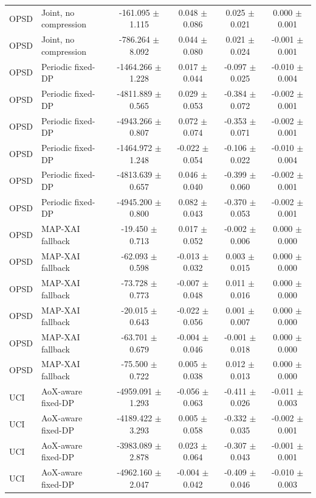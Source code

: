 \begin{tabular}{llcccc}
OPSD & Joint, no compression & -161.095 $\pm$ 1.115 & 0.048 $\pm$ 0.086 & 0.025 $\pm$ 0.021 & 0.000 $\pm$ 0.001 \\
OPSD & Joint, no compression & -786.264 $\pm$ 8.092 & 0.044 $\pm$ 0.080 & 0.021 $\pm$ 0.024 & -0.001 $\pm$ 0.001 \\
OPSD & Periodic fixed-DP & -1464.266 $\pm$ 1.228 & 0.017 $\pm$ 0.044 & -0.097 $\pm$ 0.025 & -0.010 $\pm$ 0.004 \\
OPSD & Periodic fixed-DP & -4811.889 $\pm$ 0.565 & 0.029 $\pm$ 0.053 & -0.384 $\pm$ 0.072 & -0.002 $\pm$ 0.001 \\
OPSD & Periodic fixed-DP & -4943.266 $\pm$ 0.807 & 0.072 $\pm$ 0.074 & -0.353 $\pm$ 0.071 & -0.002 $\pm$ 0.001 \\
OPSD & Periodic fixed-DP & -1464.972 $\pm$ 1.248 & -0.022 $\pm$ 0.054 & -0.106 $\pm$ 0.022 & -0.010 $\pm$ 0.004 \\
OPSD & Periodic fixed-DP & -4813.639 $\pm$ 0.657 & 0.046 $\pm$ 0.040 & -0.399 $\pm$ 0.060 & -0.002 $\pm$ 0.001 \\
OPSD & Periodic fixed-DP & -4945.200 $\pm$ 0.800 & 0.082 $\pm$ 0.043 & -0.370 $\pm$ 0.053 & -0.002 $\pm$ 0.001 \\
OPSD & MAP-XAI fallback & -19.450 $\pm$ 0.713 & 0.017 $\pm$ 0.052 & -0.002 $\pm$ 0.006 & 0.000 $\pm$ 0.000 \\
OPSD & MAP-XAI fallback & -62.093 $\pm$ 0.598 & -0.013 $\pm$ 0.032 & 0.003 $\pm$ 0.015 & 0.000 $\pm$ 0.000 \\
OPSD & MAP-XAI fallback & -73.728 $\pm$ 0.773 & -0.007 $\pm$ 0.048 & 0.011 $\pm$ 0.016 & 0.000 $\pm$ 0.000 \\
OPSD & MAP-XAI fallback & -20.015 $\pm$ 0.643 & -0.022 $\pm$ 0.056 & 0.001 $\pm$ 0.007 & 0.000 $\pm$ 0.000 \\
OPSD & MAP-XAI fallback & -63.701 $\pm$ 0.679 & -0.004 $\pm$ 0.046 & -0.001 $\pm$ 0.018 & 0.000 $\pm$ 0.000 \\
OPSD & MAP-XAI fallback & -75.500 $\pm$ 0.722 & 0.005 $\pm$ 0.038 & 0.012 $\pm$ 0.013 & 0.000 $\pm$ 0.000 \\
UCI & AoX-aware fixed-DP & -4959.091 $\pm$ 1.293 & -0.056 $\pm$ 0.063 & -0.411 $\pm$ 0.026 & -0.011 $\pm$ 0.003 \\
UCI & AoX-aware fixed-DP & -4189.422 $\pm$ 3.293 & 0.005 $\pm$ 0.058 & -0.332 $\pm$ 0.035 & -0.002 $\pm$ 0.001 \\
UCI & AoX-aware fixed-DP & -3983.089 $\pm$ 2.878 & 0.023 $\pm$ 0.064 & -0.307 $\pm$ 0.043 & -0.001 $\pm$ 0.001 \\
UCI & AoX-aware fixed-DP & -4962.160 $\pm$ 2.047 & -0.004 $\pm$ 0.042 & -0.409 $\pm$ 0.046 & -0.010 $\pm$ 0.003 \\

\end{tabular}
